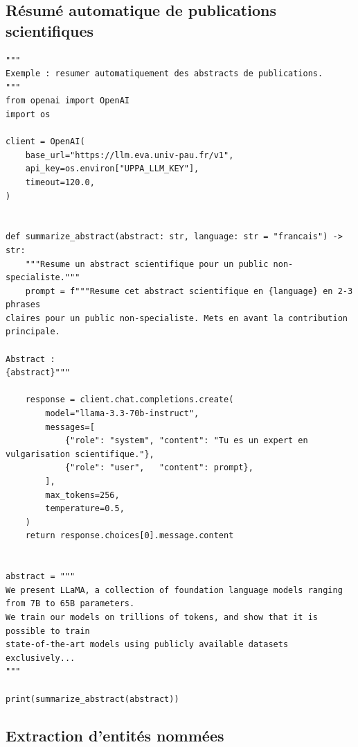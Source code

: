 \documentclass[12pt, a4paper, twoside]{article}
\begin{document}
\subsection{Résumé automatique de publications scientifiques}

\begin{lstlisting}[style=pythonstyle, caption={Résumé d'abstracts scientifiques pour un public non-spécialiste}]
"""
Exemple : resumer automatiquement des abstracts de publications.
"""
from openai import OpenAI
import os

client = OpenAI(
    base_url="https://llm.eva.univ-pau.fr/v1",
    api_key=os.environ["UPPA_LLM_KEY"],
    timeout=120.0,
)


def summarize_abstract(abstract: str, language: str = "francais") -> str:
    """Resume un abstract scientifique pour un public non-specialiste."""
    prompt = f"""Resume cet abstract scientifique en {language} en 2-3 phrases
claires pour un public non-specialiste. Mets en avant la contribution principale.

Abstract :
{abstract}"""

    response = client.chat.completions.create(
        model="llama-3.3-70b-instruct",
        messages=[
            {"role": "system", "content": "Tu es un expert en vulgarisation scientifique."},
            {"role": "user",   "content": prompt},
        ],
        max_tokens=256,
        temperature=0.5,
    )
    return response.choices[0].message.content


abstract = """
We present LLaMA, a collection of foundation language models ranging from 7B to 65B parameters.
We train our models on trillions of tokens, and show that it is possible to train
state-of-the-art models using publicly available datasets exclusively...
"""

print(summarize_abstract(abstract))
\end{lstlisting}

\subsection{Extraction d'entités nommées}
\end{document}
